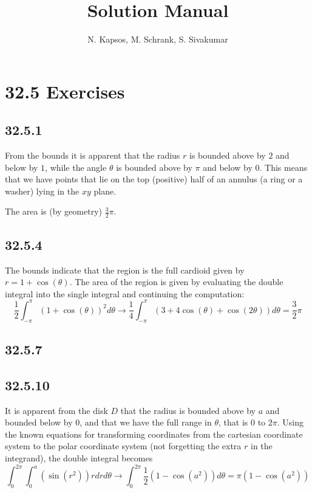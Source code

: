 \documentclass{article}
\title{Solution Manual}
\author{N. Kapsos, M. Schrank, S. Sivakumar}
\date{}
\begin{document}
\maketitle
\setcounter{secnumdepth}{0}

\section{32.5 Exercises}

\subsection{32.5.1}

From the bounds it is apparent that the radius $r$ is bounded above by $2$ and below by $1$, while the angle $\theta$ is bounded above by $\pi$ and below by $0$. This means that we have points that lie on the top (positive) half of an annulus (a ring or a washer) lying in the $xy$ plane.

The area is (by geometry) $\frac{3}{2}\pi$.

\subsection{32.5.4}

The bounds indicate that the region is the full cardioid given by $r = 1+\cos(\theta)$. The area of the region is given by evaluating the double integral into the single integral and continuing the computation: $$\frac{1}{2}\int_{-\pi}^{\pi}\left(1+\cos(\theta)\right)^2 d\theta \to  \frac{1}{4}\int_{-\pi}^{\pi} \left(3 + 4 \cos(\theta) + \cos(2 \theta)\right)d\theta = \frac{3}{2}\pi$$

\subsection{32.5.7}

\subsection{32.5.10}

It is apparent from the disk $D$ that the radius is bounded above by $a$ and bounded below by $0$, and that we have the full range in $\theta$, that is $0$ to $2\pi$. Using the known equations for transforming coordinates from the cartesian coordinate system to the polar coordinate system (not forgetting the extra $r$ in the integrand), the double integral becomes $$\int_{0}^{2\pi}\int_{0}^{a}\left(\sin(r^2)\right)rdrd\theta \to \int_{0}^{2\pi} \frac{1}{2}\left(1-\cos(a^2)\right)d\theta = \pi(1-\cos(a^2))$$
\end{document}
